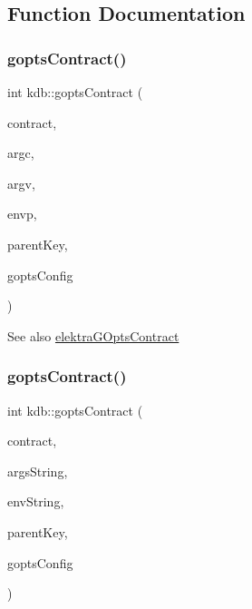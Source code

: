 \subsection{Function Documentation}
\mbox{\label{namespacekdb_afc8477f4bb768ada40b8e4b82d9fcaf0}} 
\subsubsection{\texorpdfstring{gopts\+Contract()}{goptsContract()}\hspace{0.1cm}{\footnotesize\ttfamily [1/3]}}
{\footnotesize\ttfamily int kdb\+::gopts\+Contract (\begin{DoxyParamCaption}\item[{\hyperlink{classkdb_1_1KeySet}{kdb\+::\+Key\+Set} \&}]{contract,  }\item[{int}]{argc,  }\item[{const char $\ast$const $\ast$}]{argv,  }\item[{const char $\ast$const $\ast$}]{envp,  }\item[{const \hyperlink{classkdb_1_1Key}{kdb\+::\+Key} \&}]{parent\+Key,  }\item[{\hyperlink{classkdb_1_1KeySet}{kdb\+::\+Key\+Set} \&}]{gopts\+Config }\end{DoxyParamCaption})\hspace{0.3cm}{\ttfamily [inline]}}

\begin{DoxySeeAlso}{See also}
\hyperlink{kdbgopts_8h_af4f606fc2179e917a10c77dab576d648}{elektra\+G\+Opts\+Contract} 
\end{DoxySeeAlso}
\mbox{\label{namespacekdb_a90e4547be745a211a4ad95bdd27d0254}} 
\subsubsection{\texorpdfstring{gopts\+Contract()}{goptsContract()}\hspace{0.1cm}{\footnotesize\ttfamily [2/3]}}
{\footnotesize\ttfamily int kdb\+::gopts\+Contract (\begin{DoxyParamCaption}\item[{\hyperlink{classkdb_1_1KeySet}{kdb\+::\+Key\+Set} \&}]{contract,  }\item[{const std\+::string \&}]{args\+String,  }\item[{const std\+::string \&}]{env\+String,  }\item[{const \hyperlink{classkdb_1_1Key}{kdb\+::\+Key} \&}]{parent\+Key,  }\item[{\hyperlink{classkdb_1_1KeySet}{kdb\+::\+Key\+Set} \&}]{gopts\+Config }\end{DoxyParamCaption})\hspace{0.3cm}{\ttfamily [inline]}}



